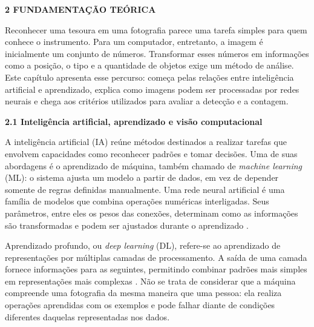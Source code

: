 \begingroup
\justifying
\setlength{\parindent}{1.25cm}
\setlength{\parskip}{0pt}
\setlength{\emergencystretch}{2em}
\onehalfspacing
{}

{}
\noindent\textbf{2 FUNDAMENTAÇÃO TEÓRICA}\par
\vspace{\baselineskip}

Reconhecer uma tesoura em uma fotografia parece uma tarefa simples para quem conhece o instrumento. Para um computador, entretanto, a imagem é inicialmente um conjunto de números. Transformar esses números em informações como a posição, o tipo e a quantidade de objetos exige um método de análise. Este capítulo apresenta esse percurso: começa pelas relações entre inteligência artificial e aprendizado, explica como imagens podem ser processadas por redes neurais e chega aos critérios utilizados para avaliar a detecção e a contagem.

\vspace{\baselineskip}
{}
\noindent\textbf{2.1 Inteligência artificial, aprendizado e visão computacional}\par
\vspace{\baselineskip}

A inteligência artificial (IA) reúne métodos destinados a realizar tarefas que envolvem capacidades como reconhecer padrões e tomar decisões. Uma de suas abordagens é o aprendizado de máquina, também chamado de \textit{machine learning} (ML): o sistema ajusta um modelo a partir de dados, em vez de depender somente de regras definidas manualmente. Uma rede neural artificial é uma família de modelos que combina operações numéricas interligadas. Seus parâmetros, entre eles os pesos das conexões, determinam como as informações são transformadas e podem ser ajustados durante o aprendizado \parencite{goodfellow2016}.

Aprendizado profundo, ou \textit{deep learning} (DL), refere-se ao aprendizado de representações por múltiplas camadas de processamento. A saída de uma camada fornece informações para as seguintes, permitindo combinar padrões mais simples em representações mais complexas \parencite{lecun2015}. Não se trata de considerar que a máquina compreende uma fotografia da mesma maneira que uma pessoa: ela realiza operações aprendidas com os exemplos e pode falhar diante de condições diferentes daquelas representadas nos dados.

